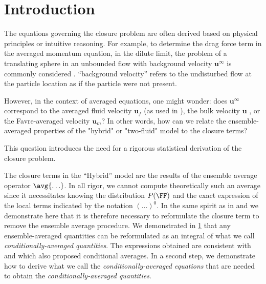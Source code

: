 \section{Introduction}
\label{ap:Closure_problem}

The equations governing the closure problem are often derived based on physical principles or intuitive reasoning.
For example, to determine the drag force term in the averaged momentum equation, in the dilute limit, the problem of a translating sphere in an unbounded flow with background velocity $\textbf{u}^\infty$ is commonly considered \citep{stone2001inertial,raja2010inertial,guazzelli2011}.
``background velocity'' refers to the undisturbed flow at the particle location as if the particle were not present.


However, in the context of averaged equations, one might wonder: does $\textbf{u}^\infty$ correspond to the averaged fluid velocity $\textbf{u}_f$ (as used in \citet{jackson1997locally,zhang1997momentum}), the bulk velocity $\textbf{u}$ \citep{kim1985modelling}, or the Favre-averaged velocity $\textbf{u}_m$?
In other words, how can we relate the ensemble-averaged properties of the "hybrid" or "two-fluid" model to the closure terms?

This question introduces the need for a rigorous statistical derivation of the closure problem.

The closure terms in the ``Hybrid'' model are the results of the ensemble average operator $\avg{\ldots}$. 
In all rigor, we cannot compute theoretically such an average since it necessitates knowing the distribution $P(\FF)$ and the exact expression of the local terms indicated by the notation $(\ldots)^0$. 
In the same spirit as in \citet{buyevich1979flow,lhuillier1992ensemble,batchelor1972sedimentation,hinch1977averaged} and \citet{zhang1994averaged} we demonstrate here that it is therefore necessary to reformulate the closure term to remove the ensemble average procedure. 
We demonstrated in \ref{ap:Closure_problem} that any ensemble-averaged quantities can be reformulated as an integral of what we call \textit{conditionally-averaged quantities}. 
The expressions obtained are consistent with \citet{lhuillier1992ensemble,batchelor1972sedimentation,hinch1977averaged} and \citet[Appendix A]{zhang1994averaged} which also proposed conditional averages. %
In a second step, we demonstrate how to derive what we call the \textit{conditionally-averaged equations} that are needed to obtain the \textit{conditionally-averaged quantities}. 

